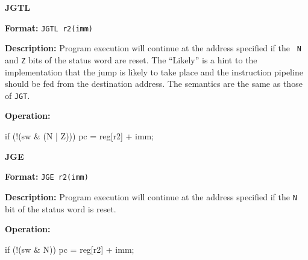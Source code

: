 \noindent\textsf{\textbf{\Large JGTL}}\par
{}\par\begin{indented}{\bf Format:}
{\tt JGTL r2(imm)}\par\vspace{3ex}
\end{indented}\vspace{4ex}
\begin{indented}{\bf Description:}
Program execution will continue at the address specified if the {\tt
N} and {\tt Z} bits of the status word are reset.  The ``Likely'' is a
hint to the implementation that the jump is likely to take place and
the instruction pipeline should be fed from the destination address. 
The semantics are the same as those of {\tt JGT}.
\end{indented}
\begin{indented}{\bf Operation:}\vspace{.8ex}
\begin{verbatimtab}
if (!(sw & (N | Z))) {
    pc = reg[r2] + imm;
}
\end{verbatimtab}
\end{indented}
\vspace{2em}

\newpage
\noindent\textsf{\textbf{\Large JGE}}\par
{}\par\begin{indented}{\bf Format:}
{\tt JGE r2(imm)}\par\vspace{3ex}
\end{indented}\vspace{4ex}
\begin{indented}{\bf Description:}
Program execution will continue at the address specified if the {\tt N} bit
of the status word is reset.
\end{indented}
\begin{indented}{\bf Operation:}\vspace{.8ex}
\begin{verbatimtab}
if (!(sw & N)) {
    pc = reg[r2] + imm;
}
\end{verbatimtab}
\end{indented}
\vspace{2em}

